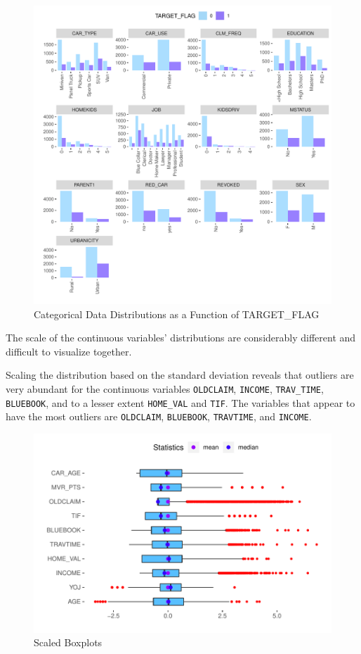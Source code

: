 \documentclass[]{article}
\begin{document}
\begin{figure}
\centering
\includegraphics{proj4_files/figure-latex/f2-1.pdf}
\caption{\label{fig:f2}Categorical Data Distributions as a Function of
TARGET\_FLAG}
\end{figure}

The scale of the continuous variables' distributions are considerably
different and difficult to visualize together.

Scaling the distribution based on the standard deviation reveals that
outliers are very abundant for the continuous variables
\texttt{OLDCLAIM}, \texttt{INCOME}, \texttt{TRAV\_TIME},
\texttt{BLUEBOOK}, and to a lesser extent \texttt{HOME\_VAL} and
\texttt{TIF}. The variables that appear to have the most outliers are
\texttt{OLDCLAIM}, \texttt{BLUEBOOK}, \texttt{TRAVTIME}, and
\texttt{INCOME}.

\begin{figure}
\centering
\includegraphics{proj4_files/figure-latex/f3-1.pdf}
\caption{\label{fig:f3}Scaled Boxplots}
\end{figure}
\end{document}
